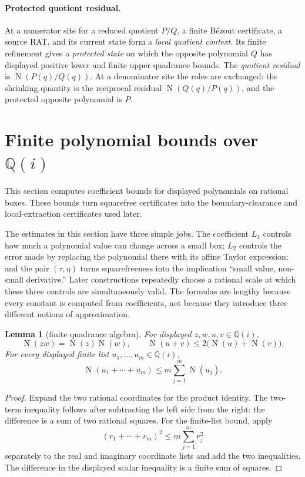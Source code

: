 \documentclass[11pt]{article}
\newtheorem{lemma}[theorem]{Lemma}
\newcommand{\Qi}{\mathbb{Q}(i)}
\newcommand{\Norm}[1]{\operatorname{N}\!\left(#1\right)}
\begin{document}
\paragraph{Protected quotient residual.}
At a numerator site for a reduced quotient $P/Q$, a finite B\'ezout
certificate, a source RAT, and its current state form a \emph{local quotient
context}.  Its finite refinement gives a \emph{protected state} on which the
opposite polynomial $Q$ has displayed positive lower and finite upper
quadrance bounds.  The \emph{quotient residual} is $\Norm{P(q)/Q(q)}$.  At a
denominator site the roles are exchanged: the shrinking quantity is the
reciprocal residual $\Norm{Q(q)/P(q)}$, and the protected opposite polynomial
is $P$.

\section{Finite polynomial bounds over \texorpdfstring{$\Qi$}{Q(i)}}
\label{sec:finite-bounds}

This section computes coefficient bounds for displayed polynomials on
rational boxes.  These bounds turn squarefree certificates into the
boundary-clearance and local-extraction certificates used later.

The estimates in this section have three simple jobs.  The coefficient
$L_1$ controls how much a polynomial value can change across a small box;
$L_2$ controls the error made by replacing the polynomial there with its
affine Taylor expression; and the pair $(\tau,\eta)$ turns squarefreeness
into the implication ``small value, non-small derivative.''  Later
constructions repeatedly choose a rational scale at which these three
controls are simultaneously valid.  The formulas are lengthy because every
constant is computed from coefficients, not because they introduce three
different notions of approximation.

\begin{lemma}[finite quadrance algebra]
\label{lem:finite-quadrance-algebra}
For displayed $z,w,u,v\in\Qi$,
\[
 \Norm{zw}=\Norm z\Norm w,
 \qquad
 \Norm{u+v}\le 2\bigl(\Norm u+\Norm v\bigr).
\]
For every displayed finite list $u_1,\dots,u_m\in\Qi$,
\begin{equation}
\label{eq:finite-sum}
 \Norm{u_1+\cdots+u_m}\le m\sum_{j=1}^{m}\Norm{u_j}.
\end{equation}
\end{lemma}

\begin{proof}
Expand the two rational coordinates for the product identity.  The
two-term inequality follows after subtracting the left side from the right:
the difference is a sum of two rational squares.  For the finite-list bound,
apply
\[
       (r_1+\cdots+r_m)^2\le m\sum_{j=1}^{m}r_j^2
\]
separately to the real and imaginary coordinate lists and add the two
inequalities.  The difference in the displayed scalar inequality is a finite
sum of squares.
\end{proof}
\end{document}
